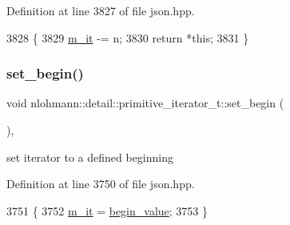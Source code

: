 Definition at line 3827 of file json.\+hpp.


\begin{DoxyCode}
3828     \{
3829         \hyperlink{classnlohmann_1_1detail_1_1primitive__iterator__t_a4357355113b0cd7e12b15c2e93703510}{m\_it} -= n;
3830         \textcolor{keywordflow}{return} *\textcolor{keyword}{this};
3831     \}
\end{DoxyCode}
\mbox{\label{classnlohmann_1_1detail_1_1primitive__iterator__t_a9d9b005906106e12aed738f97d7fee42}} 
\subsubsection{\texorpdfstring{set\+\_\+begin()}{set\_begin()}}
{\footnotesize\ttfamily void nlohmann\+::detail\+::primitive\+\_\+iterator\+\_\+t\+::set\+\_\+begin (\begin{DoxyParamCaption}{ }\end{DoxyParamCaption})\hspace{0.3cm}{\ttfamily [inline]}, {\ttfamily [noexcept]}}



set iterator to a defined beginning 



Definition at line 3750 of file json.\+hpp.


\begin{DoxyCode}
3751     \{
3752         \hyperlink{classnlohmann_1_1detail_1_1primitive__iterator__t_a4357355113b0cd7e12b15c2e93703510}{m\_it} = \hyperlink{classnlohmann_1_1detail_1_1primitive__iterator__t_afcb3bcf9da8aa95bd82067d1a67c2326}{begin\_value};
3753     \}
\end{DoxyCode}
\mbox{\label{classnlohmann_1_1detail_1_1primitive__iterator__t_ad26a823483846a12d890c3feed3097eb}} 
